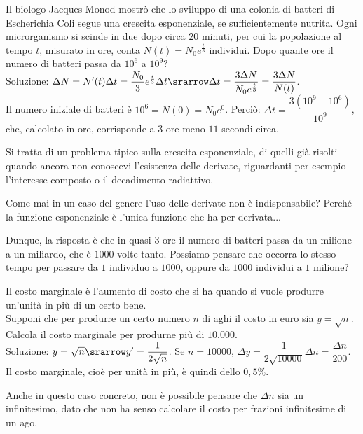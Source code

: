 \begin{esempio}
Il biologo Jacques Monod mostrò che lo sviluppo di una colonia di batteri 
di 
 Escherichia Coli segue una crescita esponenziale, se sufficientemente 
nutrita. 
 Ogni microrganismo si scinde in due dopo circa $20$ minuti, per cui la
 popolazione al tempo $t$, misurato in ore, conta $N(t)=N_0e^{\frac{t}{3}}$
 individui. Dopo quante ore il numero di batteri passa da $10^6$ a $10^9$?\\
 Soluzione: $\Delta N=N'(t)\Delta t=\dfrac{N_0}{3}e^{\frac{t}{3}}\Delta t
 \srarrow \Delta t=\dfrac{3\Delta N}{N_0e^{\frac{t}{3}}}=\dfrac{3\Delta N}
 {N(t)}$.\\
 Il numero iniziale di batteri è $10^6=N(0)=N_0e^0$. Perciò:
 $\Delta t=\dfrac{3(10^9-10^6)}{10^9}$, che, calcolato in ore, 
 corrisponde a 3 ore meno $11$ secondi circa.
 \begin{osservazione}
 Si tratta di un problema tipico sulla crescita esponenziale, di quelli già 
 risolti quando ancora non conoscevi l'esistenza delle derivate, riguardanti
 per esempio l'interesse composto o il decadimento radiattivo.
\end{osservazione}

\begin{osservazione}
 Come mai in un caso del genere l'uso delle derivate non è indispensabile? 
Perché
 la funzione esponenziale è l'unica funzione che ha per derivata...
\end{osservazione}

\begin{osservazione}
Dunque, la risposta è che in quasi $3$ ore il numero di batteri passa da un 
milione a un miliardo, che è $1000$ volte tanto. Possiamo pensare che 
occorra
lo stesso tempo per passare da $1$ individuo a $1000$, oppure da $1000$ 
individui a $1$ milione?
\end{osservazione}
\end{esempio}
 
\begin{esempio}
Il costo marginale è l'aumento di costo che si ha quando si vuole produrre 
un'unità in più di un certo bene.\\
Supponi che per produrre un certo numero $n$ di aghi il costo in euro sia
$y=\sqrt{n}$. Calcola il costo marginale per produrne più di $10.000$.\\
Soluzione: $y=\sqrt{n}\srarrow y'=\dfrac{1}{2\sqrt{n}}$.
Se $n=10000$, $\Delta y=\dfrac{1}{2\sqrt{10000}}\Delta n=\dfrac{\Delta 
n}{200}$.
Il costo marginale, cioè per unità in più, è quindi dello $0,5\%$.
\begin{osservazione}
 Anche in questo caso concreto, non è possibile pensare che $\Delta n$ sia 
un
 infinitesimo, dato che non ha senso calcolare il costo per frazioni 
 infinitesime di un ago.
\end{osservazione}
\end{esempio}
 
